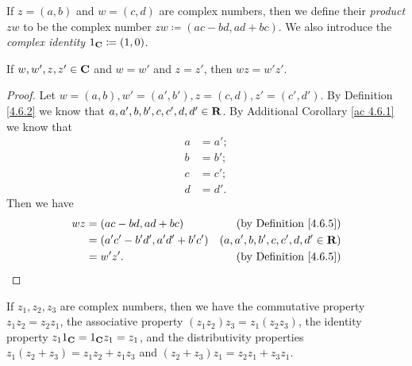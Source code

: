 \begin{definition}\label{4.6.5}
    If \(z = (a, b)\) and \(w = (c, d)\) are complex numbers, then we define their \emph{product} \(zw\) to be the complex number \(zw \coloneqq (ac - bd, ad + bc)\).
    We also introduce the \emph{complex identity} \(1_{\mathbf{C}} \coloneqq (1, 0)\).
\end{definition}

\begin{additional corollary}\label{ac 4.6.3}
If \(w, w', z, z' \in \mathbf{C}\) and \(w = w'\) and \(z = z'\), then \(wz = w'z'\).
\end{additional corollary}

\begin{proof}
    Let \(w = (a, b), w' = (a', b'), z = (c, d), z' = (c', d')\).
    By Definition \ref{4.6.2} we know that \(a, a', b, b', c, c', d, d' \in \mathbf{R}\).
    By Additional Corollary \ref{ac 4.6.1} we know that
    \begin{align*}
        a & = a'; \\
        b & = b'; \\
        c & = c'; \\
        d & = d'.
    \end{align*}
    Then we have
    \begin{align*}
        wz & = (ac - bd, ad + bc)             & \text{(by Definition \ref{4.6.5})}  \\
           & = (a' c' - b' d', a' d' + b' c') & (a, a', b, b', c, c', d, d' \in \mathbf{R}) \\
           & = w' z'.                         & \text{(by Definition \ref{4.6.5})}
    \end{align*}
\end{proof}

\begin{lemma}\label{4.6.6}
    If \(z_1, z_2, z_3\) are complex numbers, then we have the commutative property \(z_1 z_2 = z_2 z_1\), the associative property \((z_1 z_2) z_3 = z_1 (z_2 z_3)\), the identity property \(z_1 1_{\mathbf{C}} = 1_{\mathbf{C}} z_1 = z_1\), and the distributivity properties \(z_1 (z_2 + z_3) = z_1 z_2 + z_1 z_3\) and \((z_2 + z_3) z_1 = z_2 z_1 + z_3 z_1\).
\end{lemma}

